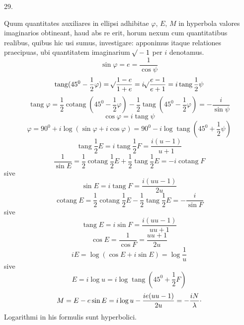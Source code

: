 \begin{center}
29.
\end{center}
Quum quantitates auxiliares in ellipsi adhibitae $\varphi$, $E$, $M$ in hyperbola valores imaginarios obtineant, haud abs re erit, horum nexum cum quantitatibus realibus, quibus hic usi sumus, investigare: apponimus itaque relationes praecipuas, ubi quantitatem imaginarium $\mathord{{}^{}\!\surd}-1$ per $i$ denotamus.
\[
\sin\varphi=e=\frac{1}{\cos\psi}
\]
\[
\operatorname{tang}(45^0-\frac{1}{2}\varphi)=\mathord{{}^{}\!\surd}\frac{1-e}{1+e}=i\mathord{{}^{}\!\surd}\frac{e-1}{e+1}=i\operatorname{tang}\frac{1}{2}\psi
\]
\[
\operatorname{tang}\varphi=\frac{1}{2}\operatorname{cotang}(45^0-\frac{1}{2}\varphi)-\frac{1}{2}\operatorname{tang}(45^0-\frac{1}{2}\varphi)=-\frac{i}{\sin\psi}
\]
\[
\cos\varphi=i\operatorname{tang}\psi
\]
\[
\varphi=90^0+i\log(\sin\varphi+i\cos\varphi)=90^0-i\log\operatorname{tang}(45^0+\frac{1}{2}\psi)
\]
\[
\operatorname{tang}\frac{1}{2}E=i\operatorname{tang}\frac{1}{2}F=\frac{i(u-1)}{u+1}
\]
\[
\frac{1}{\sin E}=\frac{1}{2}\operatorname{cotang}\frac{1}{2}E+\frac{1}{2}\operatorname{tang}\frac{1}{2}E=-i\operatorname{cotang}F
\]
sive
\[
\sin E=i\operatorname{tang}F=\frac{i(uu-1)}{2u}
\]
\[
\operatorname{cotang}E=\frac{1}{2}\operatorname{cotang}\frac{1}{2}E-\frac{1}{2}\operatorname{tang}\frac{1}{2}E=-\frac{i}{\sin F}
\]
sive
\[
\operatorname{tang}E=i\sin F=\frac{i(uu-1)}{uu+1}
\]
\[
\cos E=\frac{1}{\cos F}=\frac{uu+1}{2u}
\]
\[
iE=\log(\cos E+i\sin E)=\log\frac{1}{u}
\]
sive
\[
E=i\log u=i\log\operatorname{tang}(45^0+\frac{1}{2}F)
\]
\[
M=E-e\sin E=i\log u-\frac{ie(uu-1)}{2u}=-\frac{iN}{\lambda}\raisebox{.45ex}{.}
\]
Logarithmi in his formulis sunt hyperbolici.
